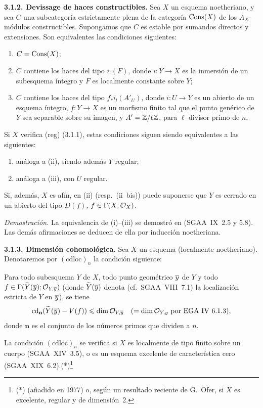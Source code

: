 \textbf{3.1.2. Devissage de haces constructibles.} Sea $X$ un esquema noetheriano, y sea $C$ una subcategoría estrictamente plena de la categoría $\operatorname{Cons}(X)$ de los $A_X$-módulos constructibles. Supongamos que $C$ es estable por sumandos directos y extensiones. Son equivalentes las condiciones siguientes:
\begin{enumerate}
\item[(i)] $C = \operatorname{Cons}(X)$;
\item[(ii)] $C$ contiene los haces del tipo $i_{!}(F)$, donde $i : Y \to X$ es la inmersión de un subesquema íntegro y $F$ es localmente constante sobre $Y$;
\item[(iii)] $C$ contiene los haces del tipo $f_{*}i_{!}(A'_U)$, donde $i : U \to Y$ es un abierto de un esquema íntegro, $f : Y \to X$ es un morfismo finito tal que el punto genérico de $Y$ sea separable sobre su imagen, y $A' = \mathbb{Z}/\ell\mathbb{Z}$, para $\ell$ divisor primo de $n$.
\end{enumerate}
Si $X$ verifica (reg) (3.1.1), estas condiciones siguen siendo equivalentes a las siguientes:
\begin{enumerate}
\item[(ii~bis)] análoga a (ii), siendo además $Y$ regular;
\item[(iii~bis)] análoga a (iii), con $U$ regular.
\end{enumerate}
Si, además, $X$ es afín, en (ii) (resp.~(ii~bis)) puede suponerse que $Y$ es cerrado en un abierto del tipo $D(f)$, $f \in \Gamma(X; \mathcal{O}_X)$.

\emph{Demostración.} La equivalencia de (i)--(iii) se demostró en (SGAA~IX~2.5 y 5.8). Las demás afirmaciones se deducen de ella por inducción noetheriana.

\textbf{3.1.3. Dimensión cohomológica.} Sea $X$ un esquema (localmente noetheriano). Denotaremos por $(\mathrm{cdloc})_n$ la condición siguiente:

Para todo subesquema $Y$ de $X$, todo punto geométrico $\overline{y}$ de $Y$ y todo $f \in \Gamma(\widetilde{Y}(\overline{y}); \mathcal{O}_{Y,\overline{y}})$ (donde $\widetilde{Y}(\overline{y})$ denota (cf.~SGAA~VIII~7.1) la localización estricta de $Y$ en $\overline{y}$), se tiene
\[
\operatorname{cd}_{\mathbf{n}}(\widetilde{Y}(\overline{y}) - V(f)) \leqslant \dim \mathcal{O}_{Y,\overline{y}} \quad (= \dim \mathcal{O}_{Y,y} \text{ por EGA~IV~6.1.3}),
\]
donde $\mathbf{n}$ es el conjunto de los números primos que dividen a $n$.

La condición $(\mathrm{cdloc})_n$ se verifica si $X$ es localmente de tipo finito sobre un cuerpo (SGAA~XIV~3.5), o es un esquema excelente de característica cero (SGAA~XIX~6.2).(*)\footnote{(*) (añadido en 1977) o, según un resultado reciente de G.~Ofer, si $X$ es excelente, regular y de dimensión~2.}

